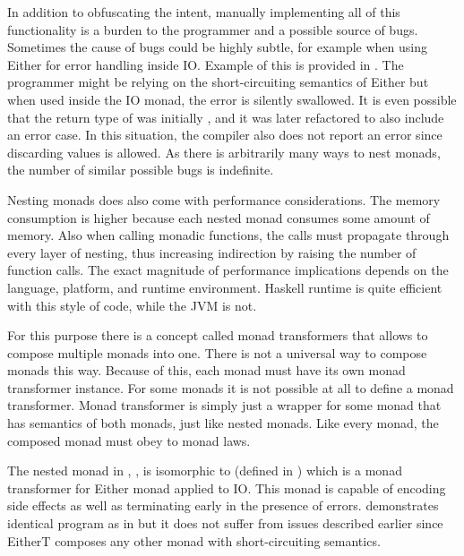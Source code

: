 

In addition to obfuscating the intent, manually implementing all of this functionality is a burden to the programmer and a possible source of bugs. Sometimes the cause of bugs could be highly subtle, for example when using Either for error handling inside IO. Example of this is provided in . The programmer might be relying on the short-circuiting semantics of Either but when used inside the IO monad, the error is silently swallowed. It is even possible that the return type of  was initially , and it was later refactored to also include an error case. In this situation, the compiler also does not report an error since discarding values is allowed. As there is arbitrarily many ways to nest monads, the number of similar possible bugs is indefinite.



Nesting monads does also come with performance considerations. The memory consumption is higher because each nested monad consumes some amount of memory. Also when calling monadic functions, the calls must propagate through every layer of nesting, thus increasing indirection by raising the number of function calls. The exact magnitude of performance implications depends on the  language, platform, and runtime environment. Haskell runtime is quite efficient with this style of code, while the JVM is not. 



For this purpose there is a concept called monad transformers that allows to compose multiple monads into one. There is not a universal way to compose monads this way. Because of this, each monad must have its own monad transformer instance. For some monads it is not possible at all to define a monad transformer. Monad transformer is simply just a wrapper for some monad that has semantics of both monads, just like nested monads. Like every monad, the composed monad must obey to monad laws.

The nested monad in , , is isomorphic to  (defined in ) which is a monad transformer for Either monad applied to IO. This monad is capable of encoding side effects as well as terminating early in the presence of errors.  demonstrates identical program as in  but it does not suffer from issues described earlier since EitherT composes any other monad with short-circuiting semantics.

